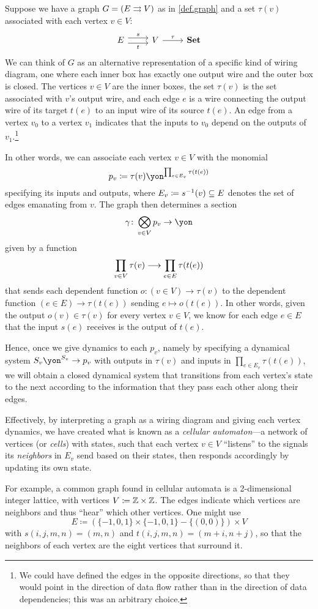 \documentclass[Book-Poly]{subfiles}
\begin{document}
\begin{example}\label{ex.graph_interaction}
Suppose we have a graph $G=(E\rightrightarrows V)$ as in \cref{def.graph} and a set $\tau(v)$ associated with each vertex $v\in V$:
\[
\begin{tikzcd}
	E\ar[r, shift left=3pt, "s"]\ar[r, shift right=3pt, "t"']&
	V\ar[r, "\tau"]&
	\smset
\end{tikzcd}
\]
We can think of $G$ as an alternative representation of a specific kind of wiring diagram, one where each inner box has exactly one output wire and the outer box is closed.
The vertices $v\in V$ are the inner boxes, the set $\tau(v)$ is the set associated with $v$'s output wire, and each edge $e$ is a wire connecting the output wire of its target $t(e)$ to an input wire of its source $t(e)$.
An edge from a vertex $v_0$ to a vertex $v_1$ indicates that the inputs to $v_0$ depend on the outputs of $v_1$.\footnote{We could have defined the edges in the opposite directions, so that they would point in the direction of data flow rather than in the direction of data dependencies; this was an arbitrary choice.}

In other words, we can associate each vertex $v\in V$ with the monomial
\[
	p_v\coloneqq\tau(v)\yon^{\prod_{e\in E_v}\tau(t(e))}
\]
specifying its inputs and outputs, where $E_v\coloneqq s^{-1}(v)\subseteq E$ denotes the set of edges emanating from $v$.
The graph then determines a section
\[
\gamma\colon\bigotimes_{v\in V}p_v\to\yon
\]
given by a function
\[
    \prod_{v\in V}\tau(v)\longrightarrow\prod_{e\in E}\tau(t(e))
\]
that sends each dependent function $o\colon(v\in V)\to\tau(v)$ to the dependent function $(e\in E)\to\tau(t(e))$ sending $e\mapsto o(t(e))$.
In other words, given the output $o(v)\in\tau(v)$ for every vertex $v\in V$, we know for each edge $e\in E$ that the input $s(e)$ receives is the output of $t(e)$.

Hence, once we give dynamics to each $p_v$, namely by specifying a dynamical system $S_v\yon^{S_v}\to p_v$ with outputs in $\tau(v)$ and inputs in $\prod_{e\in E_v}\tau(t(e))$, we will obtain a closed dynamical system that transitions from each vertex's state to the next according to the information that they pass each other along their edges.

Effectively, by interpreting a graph as a wiring diagram and giving each vertex dynamics, we have created what is known as a \emph{cellular automaton}---a network of vertices (or \emph{cells}) with states, such that each vertex $v\in V$ ``listens'' to the signals its \emph{neighbors} in $E_v$ send based on their states, then responds accordingly by updating its own state.

For example, a common graph found in cellular automata is a 2-dimensional integer lattice, with vertices $V\coloneqq\mathbb{Z}\times\mathbb{Z}$. The edges indicate which vertices are neighbors and thus ``hear'' which other vertices. One might use
\[E\coloneqq(\{-1,0,1\}\times\{-1,0,1\}-\{(0,0)\})\times V\]
with $s(i,j,m,n)=(m,n)$ and $t(i,j,m,n)=(m+i, n+j)$, so that the neighbors of each vertex are the eight vertices that surround it.
\end{example}
\end{document}
